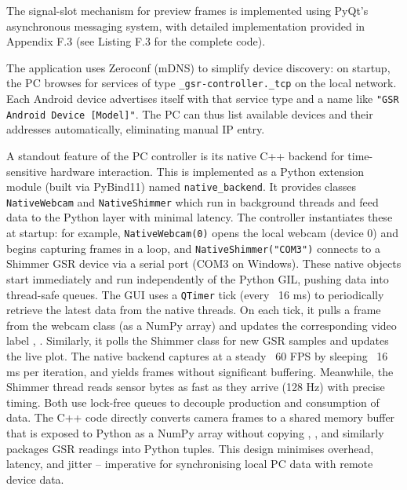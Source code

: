 The signal-slot mechanism for preview frames is implemented using PyQt's asynchronous messaging system, with detailed implementation provided in Appendix F.3 (see Listing F.3 for the complete code).

The application uses Zeroconf (mDNS) \citep{ref19} to simplify device discovery: on startup, the PC browses for services of type \texttt{\_gsr-controller.\_tcp} on the local network. Each Android device advertises itself with that service type and a name like \texttt{"GSR Android Device [Model]"}. The PC can thus list available devices and their addresses automatically, eliminating manual IP entry.

A standout feature of the PC controller is its native C++ backend for time-sensitive hardware interaction. This is implemented as a Python extension module (built via PyBind11) \citep{ref18} named \texttt{native\_backend}. It provides classes \texttt{NativeWebcam} and \texttt{NativeShimmer} which run in background threads and feed data to the Python layer with minimal latency. The controller instantiates these at startup: for example, \texttt{NativeWebcam(0)} opens the local webcam (device 0) and begins capturing frames in a loop, and \texttt{NativeShimmer("COM3")} connects to a Shimmer GSR device via a serial port (COM3 on Windows). These native objects start immediately and run independently of the Python GIL, pushing data into thread-safe queues. The GUI uses a \texttt{QTimer} tick (every ~16 ms) to periodically retrieve the latest data from the native threads. On each tick, it pulls a frame from the webcam class (as a NumPy array) and updates the corresponding video label \citep{ref1}, \citep{ref2}. Similarly, it polls the Shimmer class for new GSR samples and updates the live plot. The native backend captures at a steady ~60 FPS by sleeping ~16 ms per iteration, and yields frames without significant buffering. Meanwhile, the Shimmer thread reads sensor bytes as fast as they arrive (128 Hz) with precise timing. Both use lock-free queues to decouple production and consumption of data. The C++ code directly converts camera frames to a shared memory buffer that is exposed to Python as a NumPy array without copying \citep{ref1}, \citep{ref2}, and similarly packages GSR readings into Python tuples. This design minimises overhead, latency, and jitter -- imperative for synchronising local PC data with remote device data.


